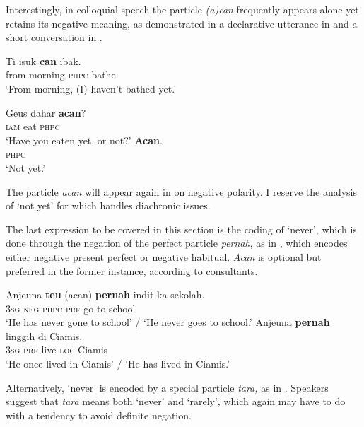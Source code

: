 \documentclass[output=paper]{langscibook}
\begin{document}
Interestingly, in colloquial speech the particle \textit{(a)can} frequently appears alone yet retains its negative meaning, as demonstrated in a declarative utterance in  and a short conversation in . 

\ea\label{ex:sun:8a}
    \gll  Ti isuk \textbf{can} ibak. \\ 
          from morning \textsc{phpc} bathe\\
    \glt ‘From morning, (I) haven’t bathed yet.’ 
\z 

\ea\label{ex:sun:8b}
    \begin{xlist}[Q: ]
        \label{ex:sun:8bA}
         \gll  Geus dahar \textbf{acan}?\\ 
              \textsc{iam} eat \textsc{phpc}\\ 
         \glt ‘Have you eaten yet, or not?’ 
        \label{ex:sun:8bB}
         \gll  \textbf{Acan}.\\ 
               \textsc{phpc}\\
         \glt ‘Not yet.’ \citep[92]{Butters2021}
    \end{xlist}
\z 


The particle \textit{acan} will appear again in  on negative polarity. I reserve the analysis of ‘{not yet}’ for   which handles diachronic issues. 

The last expression to be covered in this section is the coding of ‘{never}’, which is done through the negation of the perfect particle \textit{pernah}, as in , which encodes either negative present perfect or negative habitual. \textit{Acan} is optional but preferred in the former instance, according to consultants. 

\ea\label{ex:sun:9}
    \ea\label{ex:sun:9a}
        \gll Anjeuna \textbf{teu} (acan) \textbf{pernah} indit ka sekolah.  \\ 
              3\textsc{sg} \textsc{neg} \textsc{phpc} \textsc{prf} go to school\\
        \glt ‘He has never gone to school’ / ‘He never goes to school.’
    \ex\label{ex:sun:9b}
        \gll  Anjeuna \textbf{pernah} linggih di Ciamis.\\
        3\textsc{sg} \textsc{prf} live \textsc{loc} Ciamis \\
        \glt ‘He once lived in Ciamis’ / ‘He has lived in Ciamis.’ \citep[95]{Butters2021}
    \z
\z 

Alternatively, ‘{never}’ is encoded by a special particle \textit{tara,} as in . Speakers suggest that \textit{tara} means both ‘never’ and ‘rarely’, which again may have to do with a tendency to avoid definite negation. 
\end{document}
